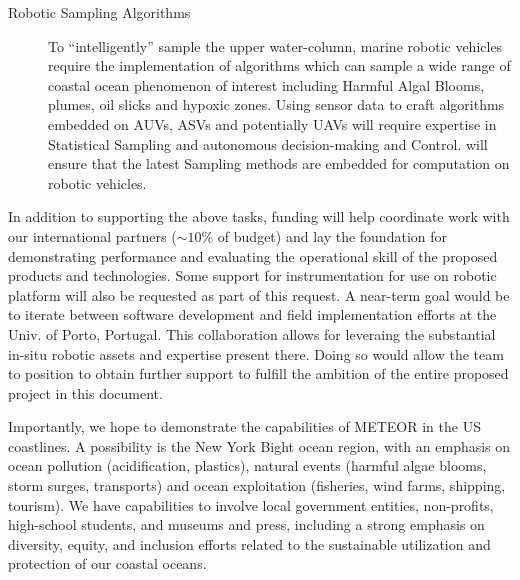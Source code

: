 \begin{description}
\item[Robotic Sampling Algorithms] To ``intelligently'' sample the upper
  water-column, marine robotic vehicles require the implementation of
  algorithms which can sample a wide range of coastal ocean phenomenon
  of interest including Harmful Algal Blooms, plumes, oil slicks and
  hypoxic zones. Using sensor data to craft algorithms embedded on AUVs,
  ASVs and potentially UAVs will require expertise in Statistical
  Sampling and autonomous decision-making and Control. \pro will ensure
  that the latest Sampling methods are embedded for computation on
  robotic vehicles.

\end{description}

\noindent
In addition to supporting the above tasks, \kck funding will help
coordinate work with our international partners ($\sim 10\%$ of budget)
and lay the foundation for demonstrating performance and evaluating the
operational skill of the proposed products and technologies. Some
support for instrumentation for use on robotic platform will also be
requested as part of this request. A near-term goal would be to iterate
between software development and field implementation efforts at the
Univ. of Porto, Portugal.  This collaboration allows for leveraing the
substantial in-situ robotic assets and expertise present there.  Doing
so would allow the team to position \pro to obtain further support to
fulfill the ambition of the entire proposed project in this document. 

Importantly, we hope to demonstrate the capabilities of METEOR in the US coastlines. A possibility is the New York Bight ocean region, with an emphasis on ocean pollution (acidification, plastics), natural events (harmful algae blooms, storm surges, transports)  and ocean exploitation (fisheries, wind farms, shipping, tourism). We have capabilities to involve local government entities, non-profits, high-school students, and museums and press, including a strong emphasis on diversity, equity, and inclusion efforts related to the sustainable utilization and protection of our coastal oceans.

